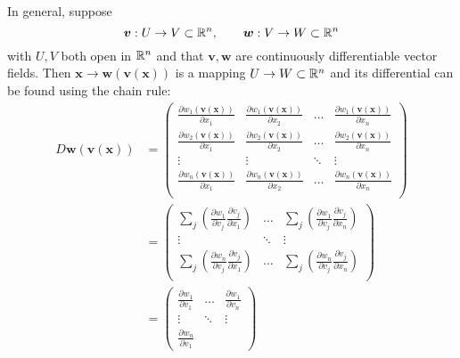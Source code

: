 \begin{remark}
    In general, suppose
    \[ \bm v: U \to V \subset \mathbb{R}^n, \qquad \bm w: V \to W \subset \mathbb{R}^n \]
    with $U,V$ both open in $\mathbb{R}^n$ and that $\bm v, \bm w$ are continuously
    differentiable vector fields.
    Then $\bm x \to \bm w(\bm v(\bm x))$ is a mapping $U \to W \subset \mathbb{R}^n$
    and its differential can be found using the chain rule:
    \begin{align*}
        D\bm w(\bm v(\bm x))
        &= \begin{pmatrix}
            \frac{\partial w_1(\bm v(\bm x))}{\partial x_1} & 
            \frac{\partial w_1(\bm v(\bm x))}{\partial x_2} & 
            \ldots & 
            \frac{\partial w_1(\bm v(\bm x))}{\partial x_n} \\            
            \frac{\partial w_2(\bm v(\bm x))}{\partial x_1} & 
            \frac{\partial w_2(\bm v(\bm x))}{\partial x_2} & 
            \ldots & 
            \frac{\partial w_2(\bm v(\bm x))}{\partial x_n} \\
            \vdots & \vdots & \ddots & \vdots \\
            \frac{\partial w_n(\bm v(\bm x))}{\partial x_1} & 
            \frac{\partial w_n(\bm v(\bm x))}{\partial x_2} & 
            \ldots & 
            \frac{\partial w_n(\bm v(\bm x))}{\partial x_n} \\
        \end{pmatrix} \\
        &= \begin{pmatrix}
            \sum_j \left(\frac{\partial w_1}{\partial v_j}\frac{\partial v_j}{\partial x_1}\right) &
            \ldots &
            \sum_j \left(\frac{\partial w_1}{\partial v_j}\frac{\partial v_j}{\partial x_n}\right) \\
            \vdots & \ddots & \vdots \\
            \sum_j \left(\frac{\partial w_n}{\partial v_j}\frac{\partial v_j}{\partial x_1}\right) &
            \ldots &
            \sum_j \left(\frac{\partial w_n}{\partial v_j}\frac{\partial v_j}{\partial x_n}\right) \\
        \end{pmatrix} \\
        &= \begin{pmatrix}
            \frac{\partial w_1}{\partial v_1} &
            \ldots &
            \frac{\partial w_1}{\partial v_n} \\
            \vdots & \ddots & \vdots \\
            \frac{\partial w_n}{\partial v_1} &

\end{pmatrix}
\end{align*}
\end{remark}
